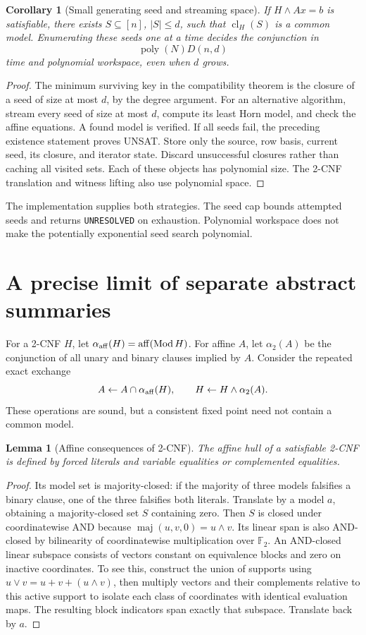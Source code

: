 \documentclass[11pt]{article}
\newtheorem{lemma}[theorem]{Lemma}
\newtheorem{corollary}[theorem]{Corollary}
\newcommand{\F}{\mathbb F_2}
\newcommand{\cl}{\operatorname{cl}}
\newcommand{\aff}{\operatorname{aff}}
\begin{document}
\begin{corollary}[Small generating seed and streaming space]
If \(H\land Ax=b\) is satisfiable, there exists \(S\subseteq[n]\),
\(|S|\le d\), such that \(\cl_H(S)\) is a common model.
Enumerating these seeds one at a time decides the conjunction in
\[
 \operatorname{poly}(N)D(n,d)
\]
time and polynomial workspace, even when \(d\) grows.
\end{corollary}
\begin{proof}
The minimum surviving key in the compatibility theorem is the closure
of a seed of size at most \(d\), by the degree argument.
For an alternative algorithm, stream every seed of size at most \(d\),
compute its least Horn model, and check the affine equations.
A found model is verified. If all seeds fail, the preceding existence
statement proves UNSAT. Store only the source, row basis, current seed,
its closure, and iterator state. Discard unsuccessful closures rather
than caching all visited sets. Each of these objects has polynomial
size. The 2-CNF translation and witness lifting also use polynomial space.
\end{proof}

The implementation supplies both strategies. The seed cap bounds
attempted seeds and returns \texttt{UNRESOLVED} on exhaustion.
Polynomial workspace does not make the potentially exponential seed
search polynomial.

\section{A precise limit of separate abstract summaries}
For a 2-CNF \(H\), let \(\alpha_{\rm aff}(H)=\aff(\operatorname{Mod}H)\).
For affine \(A\), let \(\alpha_2(A)\) be the conjunction of all unary
and binary clauses implied by \(A\). Consider the repeated exact exchange
\[
 A\leftarrow A\cap\alpha_{\rm aff}(H),
 \qquad
 H\leftarrow H\land\alpha_2(A).
\]
These operations are sound, but a consistent fixed point need not
contain a common model.

\begin{lemma}[Affine consequences of 2-CNF]
The affine hull of a satisfiable 2-CNF is defined by forced literals and
variable equalities or complemented equalities.
\end{lemma}
\begin{proof}
Its model set is majority-closed: if the majority of three models
falsifies a binary clause, one of the three falsifies both literals.
Translate by a model \(a\), obtaining a majority-closed set \(S\) containing
zero. Then \(S\) is closed under coordinatewise AND because
\(\operatorname{maj}(u,v,0)=u\wedge v\).
Its linear span is also AND-closed by bilinearity of coordinatewise
multiplication over \(\F\).
An AND-closed linear subspace consists of vectors constant on equivalence
blocks and zero on inactive coordinates. To see this, construct the
union of supports using \(u\vee v=u+v+(u\wedge v)\), then multiply vectors
and their complements relative to this active support to isolate each
class of coordinates with identical evaluation maps. The resulting
block indicators span exactly that subspace.
Translate back by \(a\).
\end{proof}
\end{document}
